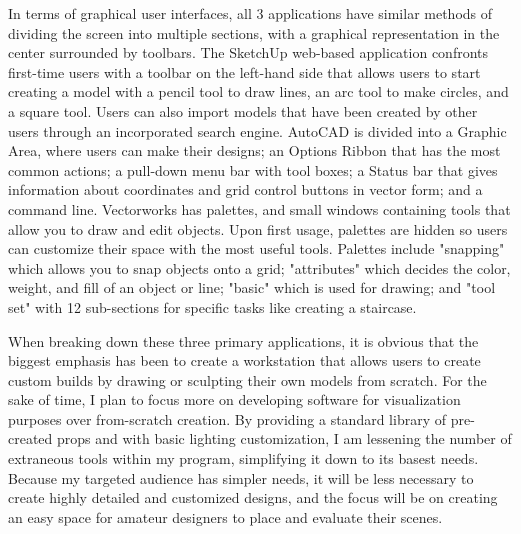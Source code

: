 \documentclass[10pt,twocolumn]{article}
\begin{document}
In terms of graphical user interfaces, all 3 applications have similar methods of dividing the screen into multiple sections, with a graphical representation in the center surrounded by toolbars. The SketchUp web-based application confronts first-time users with a toolbar on the left-hand side that allows users to start creating a model with a pencil tool to draw lines, an arc tool to make circles, and a square tool. Users can also import models that have been created by other users through an incorporated search engine. AutoCAD is divided into a Graphic Area, where users can make their designs; an Options Ribbon that has the most common actions; a pull-down menu bar with tool boxes; a Status bar that gives information about coordinates and grid control buttons in vector form; and a command line. Vectorworks has palettes, and small windows containing tools that allow you to draw and edit objects. Upon first usage, palettes are hidden so users can customize their space with the most useful tools. Palettes include "snapping" which allows you to snap objects onto a grid; "attributes" which decides the color, weight, and fill of an object or line; "basic" which is used for drawing; and "tool set" with 12 sub-sections for specific tasks like creating a staircase.

When breaking down these three primary applications, it is obvious that the biggest emphasis has been to create a workstation that allows users to create custom builds by drawing or sculpting their own models from scratch. For the sake of time, I plan to focus more on developing software for visualization purposes over from-scratch creation. By providing a standard library of pre-created props and with basic lighting customization, I am lessening the number of extraneous tools within my program, simplifying it down to its basest needs. Because my targeted audience has simpler needs, it will be less necessary to create highly detailed and customized designs, and the focus will be on creating an easy space for amateur designers to place and evaluate their scenes.
\end{document}
